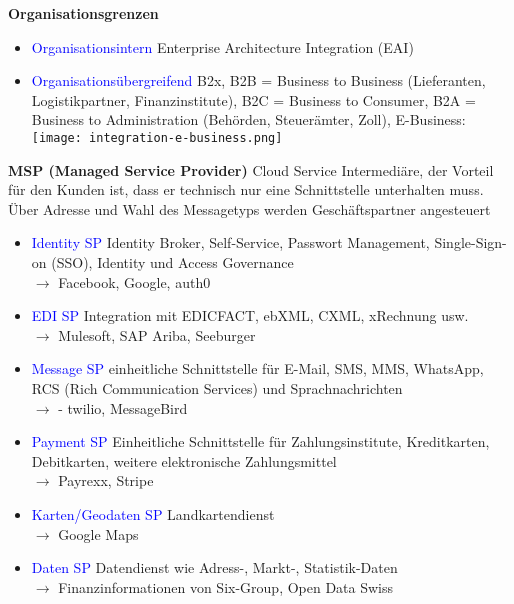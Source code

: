 
\textbf{Organisationsgrenzen}

\begin{itemize}
    \item \textcolor{blue}{Organisationsintern} Enterprise Architecture Integration (EAI)
    \item \textcolor{blue}{Organisationsübergreifend} B2x, B2B = Business to Business (Lieferanten, Logistikpartner, Finanzinstitute), B2C = Business to Consumer, B2A = Business to Administration (Behörden, Steuerämter, Zoll), E-Business: \\
    \texttt{[image: integration-e-business.png]}
\end{itemize}
\vspace{10pt}
\textbf{MSP (Managed Service Provider)}
Cloud Service Intermediäre, der Vorteil für den Kunden ist, dass er technisch nur eine Schnittstelle unterhalten muss. Über Adresse und Wahl des Messagetyps werden Geschäftspartner angesteuert

\begin{itemize}
    \item \textcolor{blue}{Identity SP} Identity Broker, Self-Service, Passwort Management, Single-Sign-on (SSO), Identity und Access Governance \\ $\rightarrow$ Facebook, Google, auth0
    \item \textcolor{blue}{EDI SP} Integration mit EDICFACT, ebXML, CXML, xRechnung usw. \\ $\rightarrow$ Mulesoft, SAP Ariba, Seeburger
    \item \textcolor{blue}{Message SP} einheitliche Schnittstelle für E-Mail, SMS, MMS, WhatsApp, RCS (Rich Communication Services) und Sprachnachrichten \\ $\rightarrow$ - twilio, MessageBird
    \item \textcolor{blue}{Payment SP} Einheitliche Schnittstelle für Zahlungsinstitute, Kreditkarten, Debitkarten, weitere elektronische Zahlungsmittel \\ $\rightarrow$ Payrexx, Stripe
    \item \textcolor{blue}{Karten/Geodaten SP} Landkartendienst \\ $\rightarrow$ Google Maps
    \item \textcolor{blue}{Daten SP} Datendienst wie Adress-, Markt-, Statistik-Daten \\ $\rightarrow$ Finanzinformationen von Six-Group, Open Data Swiss
\end{itemize}
